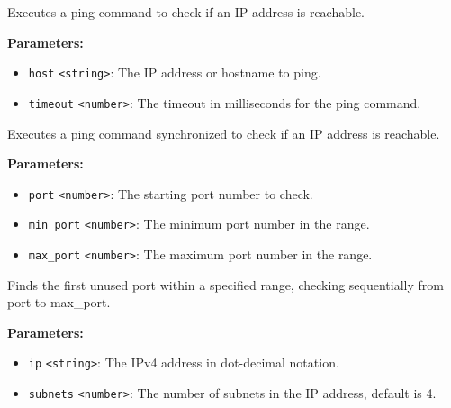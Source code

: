 \documentclass[12pt,a4paper]{article}
\begin{document}
\noindent Executes a ping command to check if an IP address is reachable.

\vspace{5mm}
\noindent {}


\noindent \textbf{Parameters:}
\begin{itemize}
  \item \texttt{host} \texttt{<string>}: The IP address or hostname to ping.
  \item \texttt{timeout} \texttt{<number>}: The timeout in milliseconds for the ping command.
\end{itemize}

\noindent Executes a ping command synchronized to check if an IP address is reachable.

\vspace{5mm}
\noindent {}


\noindent \textbf{Parameters:}
\begin{itemize}
  \item \texttt{port} \texttt{<number>}: The starting port number to check.
  \item \texttt{min\_port} \texttt{<number>}: The minimum port number in the range.
  \item \texttt{max\_port} \texttt{<number>}: The maximum port number in the range.
\end{itemize}

\noindent Finds the first unused port within a specified range, checking sequentially from \textasciigrave{}port\textasciigrave{} to \textasciigrave{}max\_port\textasciigrave{}.

\vspace{5mm}
\noindent {}


\noindent \textbf{Parameters:}
\begin{itemize}
  \item \texttt{ip} \texttt{<string>}: The IPv4 address in dot-decimal notation.
  \item \texttt{subnets} \texttt{<number>}: The number of subnets in the IP address, default is 4.
\end{itemize}
\end{document}
